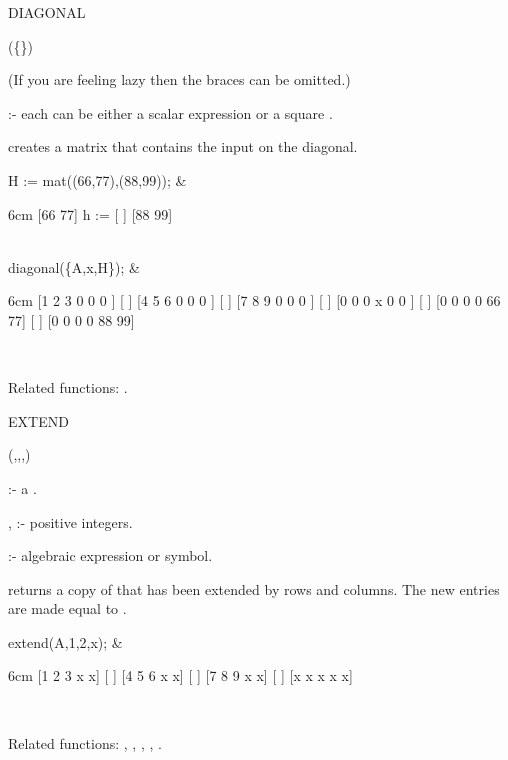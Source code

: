 \begin{Operator}[diagonal]{DIAGONAL}

\begin{Syntax}
(\{\}) 
\end{Syntax}
(If you are feeling lazy then the braces can be omitted.)

 :- each can be either a scalar expression or a 
square . 

 creates a matrix that contains the input on the 
diagonal.

\begin{Examples}

H := mat((66,77),(88,99)); &
\begin{multilineoutput}{6cm}
     [66  77]
h := [      ]
     [88  99]
\end{multilineoutput} \\

diagonal(\{A,x,H\}); &
\begin{multilineoutput}{6cm}
[1  2  3  0  0   0 ]
[                  ]
[4  5  6  0  0   0 ]
[                  ]
[7  8  9  0  0   0 ]
[                  ]
[0  0  0  x  0   0 ]
[                  ]
[0  0  0  0  66  77]
[                  ]
[0  0  0  0  88  99]
\end{multilineoutput} \\

\end{Examples}

Related functions: 
.

\end{Operator}


\begin{Operator}[extend]{EXTEND}

\begin{Syntax}
(,,,)
\end{Syntax}

            :- a . 

,        :- positive integers. 

              :- algebraic expression or symbol.

 returns a copy of  that has been extended by 
 rows and  columns. The new entries are made equal to 
.

\begin{Examples}

extend(A,1,2,x); &
\begin{multilineoutput}{6cm}
[1  2  3  x  x]
[             ]
[4  5  6  x  x]
[             ]
[7  8  9  x  x]
[             ]
[x  x  x  x  x]
\end{multilineoutput} \\

\end{Examples}

Related functions: 
, , ,  
, .

\end{Operator}


